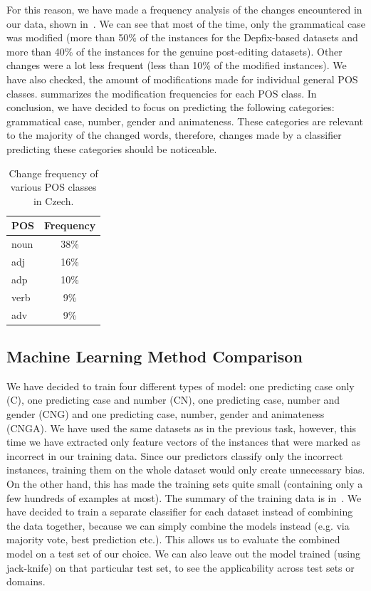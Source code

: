 For this reason, we have made a frequency analysis of the changes encountered
in our data, shown in~. We can see that most of the time, only the grammatical
case was modified (more than 50\% of the instances for the Depfix-based datasets and more than 40\% of the instances for
the genuine post-editing datasets). Other changes were a lot less frequent (less than 10\% of the modified instances).
We have also checked, the amount of modifications made for individual general POS classes.
 summarizes the modification frequencies for each
POS class. In conclusion, we have decided to focus on predicting the following categories: grammatical case, number, gender
and animateness. These categories are relevant to the majority of the changed words, therefore, changes made by
a classifier predicting these categories should be noticeable.

\begin{table}[t]
\centering
\small

\begin{tabular}{lc}
POS  &  Frequency  \\
\hline
noun    &   38\%  \\
adj     &   16\%  \\
adp     &   10\%  \\
verb    &   9\%  \\
adv     &   9\%  \\
\end{tabular}
\caption{
    Change frequency of various POS classes in Czech.
}
\label{changes-pos}
\end{table}


\subsection{Machine Learning Method Comparison}

We have decided to train four different types of model: one predicting case only (C), one predicting case and number (CN),
 one predicting case, number and gender (CNG) and one predicting case, number, gender and animateness (CNGA).
We have used the same datasets as in the previous task, however, this
time we have extracted only feature vectors of the instances that were marked as incorrect in our training data. Since
our predictors classify only the incorrect instances, training them on the whole dataset would only create
unnecessary bias. On the other hand, this has made the training sets quite small (containing only a few hundreds of examples
at most). The summary of the training data is in~. We have decided to train a separate classifier
for each dataset instead of combining the data together, because we can simply combine the models instead (e.g. via majority
vote, best prediction etc.). This allows us to evaluate the combined model on a test set of our choice.
We can also leave out the model trained (using jack-knife) on that particular test set, to see the applicability across test sets or domains.

